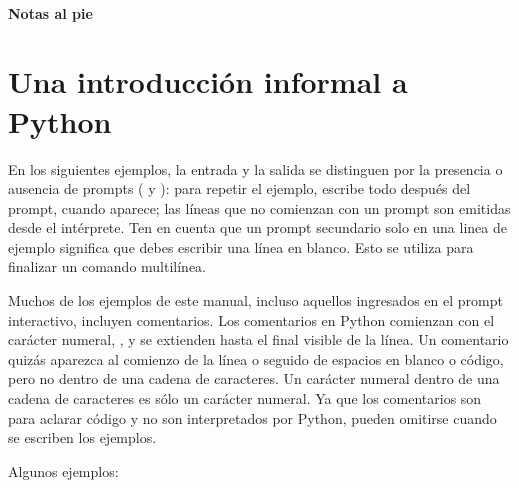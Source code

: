 \documentclass[a5paper,10pt,spanish]{sphinxmanual}
\begin{document}
\begin{sphinxVerbatim}[commandchars=\\\{\}]
\end{sphinxVerbatim}
\subsubsection*{Notas al pie}


\chapter{Una introducción informal a Python}
\label{\detokenize{tutorial/introduction:an-informal-introduction-to-python}}\label{\detokenize{tutorial/introduction:tut-informal}}\label{\detokenize{tutorial/introduction::doc}}
\sphinxAtStartPar
En los siguientes ejemplos, la entrada y la salida se distinguen por la presencia o ausencia de prompts ({\hyperref[\detokenize{glossary:term-0}]{}} y {\hyperref[\detokenize{glossary:term-...}]{}}): para repetir el ejemplo, escribe todo después del prompt, cuando aparece; las líneas que no comienzan con un prompt son emitidas desde el intérprete. Ten en cuenta que un prompt secundario solo en una linea de ejemplo significa que debes escribir una línea en blanco. Esto se utiliza para finalizar un comando multilínea.

\ignorespaces 
\sphinxAtStartPar
Muchos de los ejemplos de este manual, incluso aquellos ingresados en el prompt interactivo, incluyen comentarios. Los comentarios en Python comienzan con el carácter numeral, \sphinxcode{\sphinxupquote{\#}}, y se extienden hasta el final visible de la línea. Un comentario quizás aparezca al comienzo de la línea o seguido de espacios en blanco o código, pero no dentro de una cadena de caracteres. Un carácter numeral dentro de una cadena de caracteres es sólo un carácter numeral. Ya que los comentarios son para aclarar código y no son interpretados por Python, pueden omitirse cuando se escriben los ejemplos.

\sphinxAtStartPar
Algunos ejemplos:

\begin{sphinxVerbatim}[commandchars=\\\{\}]
    
  
\end{sphinxVerbatim}
\end{document}
